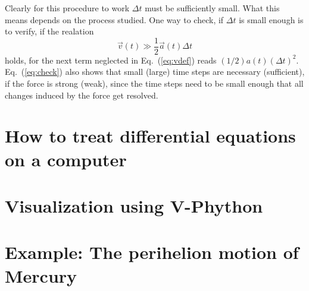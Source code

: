\documentclass[12pt]{iopart}
\begin{document}
Clearly for this procedure to work $\Delta t$ must be sufficiently small. What this means depends on the process
studied. One way to check, if $\Delta t$ is small enough is to verify, if the realation
\begin{equation}
\vec v(t) \gg \frac12\vec a(t)\Delta t
\label{eq:check}
\end{equation}
holds, for the next term neglected in Eq.~(\ref{eq:vdef}) reads $(1/2)a(t)(\Delta t)^2$.  Eq.~({\ref{eq:check}})
also shows that small (large) time steps are necessary (sufficient), if the force is strong (weak), since
the time steps need to be small enough that all changes induced by the force get resolved.


\section{How to treat differential equations on a computer}


\section{Visualization using V-Phython}


\section{Example: The perihelion motion of Mercury}
\end{document}
